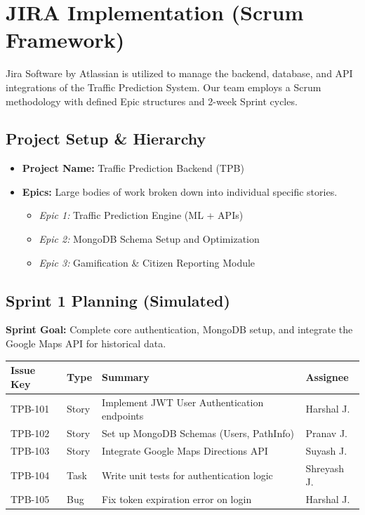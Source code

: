 \documentclass[12pt,a4paper]{article}
\begin{document}
\section{JIRA Implementation (Scrum Framework)}
Jira Software by Atlassian is utilized to manage the backend, database, and API integrations of the Traffic Prediction System. Our team employs a Scrum methodology with defined Epic structures and 2-week Sprint cycles.

\subsection{Project Setup \& Hierarchy}
\begin{itemize}
    \item \textbf{Project Name:} Traffic Prediction Backend (TPB)
    \item \textbf{Epics:} Large bodies of work broken down into individual specific stories.
    \begin{itemize}
        \item \textit{Epic 1:} Traffic Prediction Engine (ML + APIs)
        \item \textit{Epic 2:} MongoDB Schema Setup and Optimization
        \item \textit{Epic 3:} Gamification \& Citizen Reporting Module
    \end{itemize}
\end{itemize}

\subsection{Sprint 1 Planning (Simulated)}
\textbf{Sprint Goal:} Complete core authentication, MongoDB setup, and integrate the Google Maps API for historical data.

\begin{center}
\small
\begin{tabularx}{\textwidth}{l l X l}
\toprule
\textbf{Issue Key} & \textbf{Type} & \textbf{Summary} & \textbf{Assignee} \\
\midrule
TPB-101 & Story & Implement JWT User Authentication endpoints & Harshal J. \\
TPB-102 & Story & Set up MongoDB Schemas (Users, PathInfo) & Pranav J. \\
TPB-103 & Story & Integrate Google Maps Directions API & Suyash J. \\
TPB-104 & Task & Write unit tests for authentication logic & Shreyash J. \\
TPB-105 & Bug & Fix token expiration error on login & Harshal J. \\
\bottomrule
\end{tabularx}
\end{center}
\end{document}
